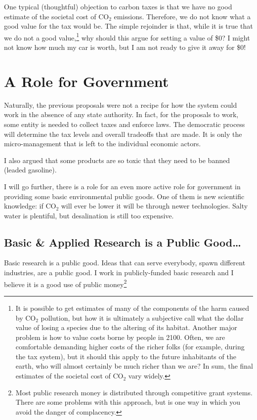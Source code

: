 One typical (thoughtful) objection to carbon taxes is that we have no good
estimate of the societal cost of CO${}_2$ emissions. Therefore, we do not know
what a good value for the tax would be. The simple rejoinder is that, while it
is true that we do not a good value,\footnote{It is possible to get estimates
of many of the components of the harm caused by CO${}_2$ pollution, but how it
is ultimately a subjective call what the dollar value of losing a species due
to the altering of its habitat. Another major problem is how to value costs
borne by people in 2100. Often, we are comfortable demanding higher costs of
the richer folks (for example, during the tax system), but it should this apply
to the future inhabitants of the earth, who will almost certainly be much
richer than we are? In sum, the final estimates of the societal cost of
CO${}_2$ vary widely.} why should this argue for setting a value of \$0? I
might not know how much my car is worth, but I am not ready to give it away for
\$0!

\section{A Role for Government}

Naturally, the previous proposals were not a recipe for how the system could
work in the absence of any state authority. In fact, for the proposals to work,
some entity is needed to collect taxes and enforce laws. The democratic process
will determine the tax levels and overall tradeoffs that are made. It is only
the micro-management that is left to the individual economic actors.

I also argued that some products are so toxic that they need to be banned
(leaded gasoline).

I will go further, there is a role for an even more active role for government
in providing some basic environmental public goods. One of them is new
scientific knowledge: if CO${}_2$ will ever be lower it will be through newer
technologies. Salty water is plentiful, but desalination is still too
expensive.

\subsection{Basic \& Applied Research is a Public Good\ldots}

Basic research is a public good. Ideas that can serve everybody, spawn
different industries, are a public good. I work in publicly-funded basic
research and I believe it is a good use of public money\footnote{Most public
research money is distributed through competitive grant systems. There are some
problems with this approach, but is one way in which you avoid the danger of
complacency.}

